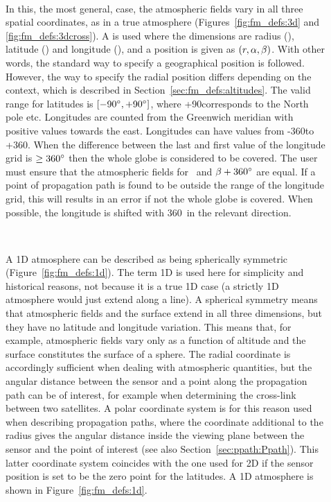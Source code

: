 \begin{description}
  
\item[\,\,\,] In this, the most general, case, the
  atmospheric fields vary in all three spatial coordinates, as in a
  true atmosphere (Figures~\ref{fig:fm_defs:3d} and
  \ref{fig:fm_defs:3dcross}). A  is used where the dimensions are radius (\Rds), latitude
  (\Lat) and longitude (\Lon), and a position is given as
  $(r,\alpha,\beta)$. With other words, the standard way to specify a
  geographical position is followed.  However, the way to specify the
  radial position differs depending on the context, which is described
  in Section~\ref{sec:fm_defs:altitudes}. The valid range for
  latitudes is $[-90^\circ,+90^\circ]$, where +90\degree corresponds
  to the North pole etc. Longitudes are counted from the Greenwich
  meridian with positive values towards the east. Longitudes can have
  values from -360\degree to +360\degree. When the difference between
  the last and first value of the longitude grid is $\geq 360^\circ$
  then the whole globe is considered to be covered. The user must
  ensure that the atmospheric fields for \Lon\ and $\beta+360^\circ$
  are equal. If a point of propagation path is found to be outside the
  range of the longitude grid, this will results in an error if not
  the whole globe is covered. When possible, the longitude is shifted with
  360\degree\ in the relevant direction.
  
\item[\,\,\,] A 1D atmosphere can be described as being
  spherically symmetric (Figure~\ref{fig:fm_defs:1d}). The term 1D is
  used here for simplicity and historical reasons, not because it is a
  true 1D case (a strictly 1D atmosphere would just extend along a
  line). A spherical symmetry means that atmospheric fields and the
  surface extend in all three dimensions, but they have no latitude
  and longitude variation. This means that, for example, atmospheric
  fields vary only as a function of altitude and the surface
  constitutes the surface of a sphere. The radial coordinate is
  accordingly sufficient when dealing with atmospheric quantities, but
  the angular distance between the sensor and a point along the
  propagation path can be of interest, for example when determining
  the cross-link between two satellites. A polar coordinate system is
  for this reason used when describing propagation paths, where the
  coordinate additional to the radius gives the angular distance
  inside the viewing plane between the sensor and the point of
  interest (see also Section~\ref{sec:ppath:Ppath}). This latter
  coordinate system coincides with the one used for 2D if the sensor
  position is set to be the zero point for the latitudes. A 1D
  atmosphere is shown in Figure~\ref{fig:fm_defs:1d}.
  

\end{description}
